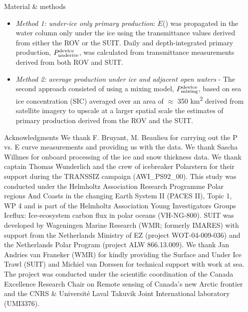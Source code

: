 \documentclass[final]{beamer}
\newlength{\sepwidth}
\newlength{\colwidth}
\newcommand{\separatorcolumn}{\begin{column}{\sepwidth}\end{column}}
\newcommand{\eparscalar}{\ensuremath{\mathring{E}}(\text{PAR})}
\newcommand{\ppundericedevice}{\ensuremath{P_{\text{\scriptsize underice}}^{\text{\scriptsize device}}}}
\newcommand{\ppmixingdevice}{\ensuremath{P_{\text{\scriptsize mixing}}^{\text{\scriptsize device}}}}
\begin{document}
\begin{frame}[t]
\begin{columns}[t]
\begin{column}{\colwidth}
\begin{block}{\small Material \& methods}
				\begin{itemize}
					\justifying
					\item \textit{Method 1: under-ice only primary production}: \eparscalar{} was propagated in the water column only under the ice using the transmittance values derived from either the ROV or the SUIT. Daily and depth-integrated primary production, \ppundericedevice{}, was calculated from transmittance measurements derived from both ROV and SUIT.
					\item \textit{Method 2: average production under ice and adjacent open waters} - The second approach consisted of using a mixing model, \ppmixingdevice{}, based on sea ice concentration (SIC) averaged over an area of $\approx$ 350 km\textsuperscript{2} derived from satellite imagery to upscale at a larger spatial scale the estimates of primary production derived from the ROV and the SUIT.
				\end{itemize}
			\end{block}

			\begin{block}{\small Acknowledgments}
				\footnotesize{We thank F. Bruyant, M. Beaulieu for carrying out the P vs. E curve measurements and providing us with the data. We thank Sascha Willmes for onboard processing of the ice and snow thickness data. We thank captain Thomas Wunderlich and the crew of icebreaker Polarstern for their support during the TRANSSIZ campaign (AWI\_PS92\_00). This study was conducted under the Helmholtz Association Research Programme Polar regions And Coasts in the changing Earth System II (PACES II), Topic 1, WP 4 and is part of the Helmholtz Association Young Investigators Groups Iceflux: Ice-ecosystem carbon flux in polar oceans (VH-NG-800). SUIT was developed by Wageningen Marine Research (WMR; formerly IMARES) with support from the Netherlands Ministry of EZ (project WOT-04-009-036) and the Netherlands Polar Program (project ALW 866.13.009). We thank Jan Andries van Franeker (WMR) for kindly providing the Surface and Under Ice Trawl (SUIT) and Michiel van Dorssen for technical support with work at sea. The project was conducted under the scientific coordination of the Canada Excellence Research Chair on Remote sensing of Canada's new Arctic frontier and the CNRS \& Université Laval Takuvik Joint International laboratory (UMI3376).}
			\end{block}
		\end{column}

		\separatorcolumn
	\end{columns}
\end{frame}
\end{document}

